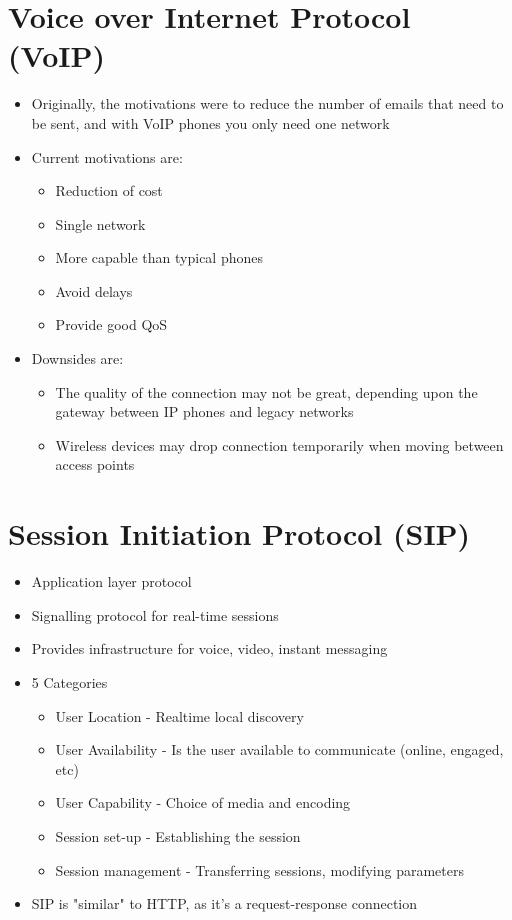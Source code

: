 
\section*{Voice over Internet Protocol (VoIP)}

\begin{itemize}
  \item Originally, the motivations were to reduce the number of emails that need to be sent, and with VoIP phones you only need one network
  \item Current motivations are:
  \begin{itemize}
    \item Reduction of cost
    \item Single network
    \item More capable than typical phones
    \item Avoid delays
    \item Provide good QoS
  \end{itemize}
  \item Downsides are:
  \begin{itemize}
    \item The quality of the connection may not be great, depending upon the gateway between IP phones and legacy networks
    \item Wireless devices may drop connection temporarily when moving between access points
  \end{itemize}
\end{itemize}
  
\section*{Session Initiation Protocol (SIP)}

\begin{itemize}
  \item Application layer protocol
  \item Signalling protocol for real-time sessions
  \item Provides infrastructure for voice, video, instant messaging
  \item 5 Categories
  \begin{itemize}
    \item User Location - Realtime local discovery
    \item User Availability - Is the user available to communicate (online, engaged, etc)
    \item User Capability - Choice of media and encoding
    \item Session set-up - Establishing the session
    \item Session management - Transferring sessions, modifying parameters
  \end{itemize}
  \item SIP is "similar" to HTTP, as it's a request-response connection
\end{itemize}

